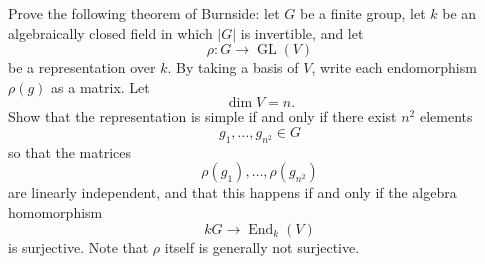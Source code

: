     \begin{exercise}
    Prove the following theorem of Burnside: let \(G\) be a finite group, let \(k\)
    be an algebraically closed field in which \(|G|\) is invertible, and let
    \[
        \rho : G \longrightarrow \operatorname{GL}(V)
    \]
    be a representation over \(k\). By taking a basis of \(V\), write each
    endomorphism \(\rho(g)\) as a matrix. Let
    \[
        \dim V = n.
    \]
    Show that the representation is simple if and only if there exist \(n^2\)
    elements
    \[
        g_1,\ldots,g_{n^2}\in G
    \]
    so that the matrices
    \[
        \rho(g_1),\ldots,\rho(g_{n^2})
    \]
    are linearly independent, and that this happens if and only if the algebra
    homomorphism
    \[
        kG \longrightarrow \operatorname{End}_k(V)
    \]
    is surjective. Note that \(\rho\) itself is generally not surjective.
    \end{exercise}

